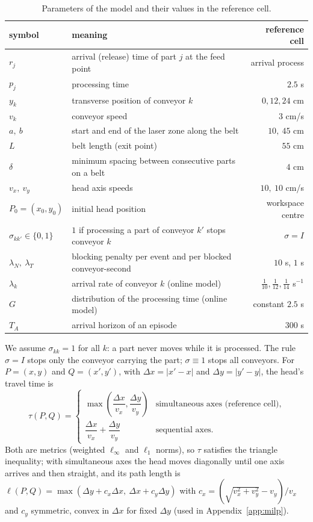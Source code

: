 \documentclass[11pt,a4paper]{article}
\theoremstyle{plain}
\theoremstyle{definition}
\theoremstyle{remark}
\begin{document}
\begin{table}[t]
\centering\small
\caption{Parameters of the model and their values in the reference cell.}
\label{tab:params}
\begin{tabularx}{\linewidth}{@{}l X r@{}}
\toprule
symbol & meaning & reference cell\\
\midrule
$r_j$ & arrival (release) time of part $j$ at the feed point & arrival process\\
$p_j$ & processing time & $2.5$ s\\
$y_k$ & transverse position of conveyor $k$ & $0,12,24$ cm\\
$v_k$ & conveyor speed & $3$ cm/s\\
$a,\ b$ & start and end of the laser zone along the belt & $10,\ 45$ cm\\
$L$ & belt length (exit point) & $55$ cm\\
$\delta$ & minimum spacing between consecutive parts on a belt & $4$ cm\\
$v_x,\ v_y$ & head axis speeds & $10,\ 10$ cm/s\\
$P_0=(x_0,y_0)$ & initial head position & workspace centre\\
$\sigma_{kk'}\in\{0,1\}$ & $1$ if processing a part of conveyor $k'$ stops conveyor $k$ & $\sigma=I$\\
$\lambda_N,\ \lambda_T$ & blocking penalty per event and per blocked conveyor-second & $10$ s, $1$ s\\
$\lambda_k$ & arrival rate of conveyor $k$ (online model) & $\tfrac1{10},\tfrac1{12},\tfrac1{14}$ s$^{-1}$\\
$G$ & distribution of the processing time (online model) & constant $2.5$ s\\
$T_A$ & arrival horizon of an episode & $300$ s\\
\bottomrule
\end{tabularx}
\end{table}

We assume $\sigma_{kk}=1$ for all $k$: a part never moves while it is processed. The
rule $\sigma=I$ stops only the conveyor carrying the part; $\sigma\equiv1$ stops all
conveyors. For $P=(x,y)$ and $Q=(x',y')$, with $\Delta x=|x'-x|$ and $\Delta y=|y'-y|$, the
head's travel time is
\begin{equation}\label{eq:tau}
\tau(P,Q)=
\begin{cases}
\max\!\left(\dfrac{\Delta x}{v_x},\dfrac{\Delta y}{v_y}\right) & \text{simultaneous axes (reference cell)},\\[2ex]
\dfrac{\Delta x}{v_x}+\dfrac{\Delta y}{v_y} & \text{sequential axes.}
\end{cases}
\end{equation}
Both are metrics (weighted $\ell_\infty$ and $\ell_1$ norms), so $\tau$ satisfies the
triangle inequality; with simultaneous axes the head moves diagonally until one axis
arrives and then straight, and its path length is
$\ell(P,Q)=\max(\Delta y+c_x\Delta x,\ \Delta x+c_y\Delta y)$ with
$c_x=(\sqrt{v_x^2+v_y^2}-v_y)/v_x$ and $c_y$ symmetric, convex in $\Delta x$ for fixed
$\Delta y$ (used in Appendix~\ref{app:milp}).
\end{document}
